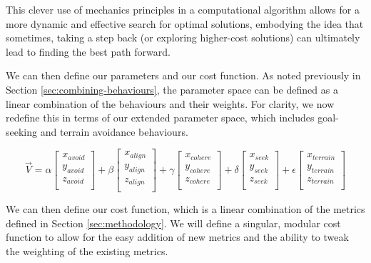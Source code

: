 \documentclass[12pt]{article}
\begin{document}
This clever use of mechanics principles in a computational algorithm allows for a more dynamic and effective search for optimal solutions, embodying the idea that sometimes, taking a step back (or exploring higher-cost solutions) can ultimately lead to finding the best path forward.

We can then define our parameters and our cost function. As noted previously in Section \ref{sec:combining-behaviours}, the parameter space can be defined as a linear combination of the behaviours and their weights. For clarity, we now redefine this in terms of our extended parameter space, which includes goal-seeking and terrain avoidance behaviours.

\begin{equation}
\vec{V} = 
\alpha
\begin{bmatrix}
    x_{avoid} \\
    y_{avoid} \\
    z_{avoid} \\
\end{bmatrix}
+ \beta
\begin{bmatrix}
    x_{align} \\
    y_{align} \\
    z_{align} \\
\end{bmatrix}
+ \gamma
\begin{bmatrix}
    x_{cohere} \\
    y_{cohere} \\
    z_{cohere} \\
\end{bmatrix}
+ \delta
\begin{bmatrix}
    x_{seek} \\
    y_{seek} \\
    z_{seek} \\
\end{bmatrix}
+ \epsilon
\begin{bmatrix}
    x_{terrain} \\
    y_{terrain} \\
    z_{terrain} \\
\end{bmatrix}
\end{equation}

We can then define our cost function, which is a linear combination of the metrics defined in Section \ref{sec:methodology}. We will define a singular, modular cost function to allow for the easy addition of new metrics and the ability to tweak the weighting of the existing metrics. 
\end{document}
